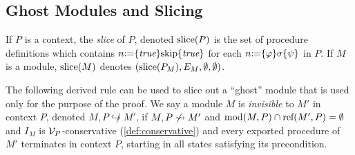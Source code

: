 




\subsection{Ghost Modules and Slicing}


\begin{definition}
  If $P$ is a context, the \emph{slice} of $P$, denoted $\mbox{\rm slice}(P)$ is the set of procedure definitions
  which contains $n \mbox{:=} \{{\textit{true}}\} \mbox{skip} \{{\textit{true}}\}$ for each $n \mbox{:=} \{\varphi\} \sigma \{\psi\}$ in $P$.
  If $M$ is a module, $\mbox{\rm slice}(M)$ denotes $(\mbox{\rm slice}(P_M),E_M,\emptyset,\emptyset)$.
\end{definition}

The following derived rule can be used to slice out a ``ghost'' module
that is used only for the purpose of the proof. We say a module $M$ is \emph{invisible} to
$M'$ in context $P$, denoted $M,P \not \hookrightarrow M'$, if $M,P\not\leadsto M'$ and $\mbox{\rm mod}(M,P) \cap \mbox{\rm ref}(M',P) = \emptyset$ and $I_M$ is $\mathcal{V}_{P}$-conservative (\cref{def:conservative}) and every exported procedure of $M'$ terminates in context $P$,
starting in all states satisfying its precondition.

